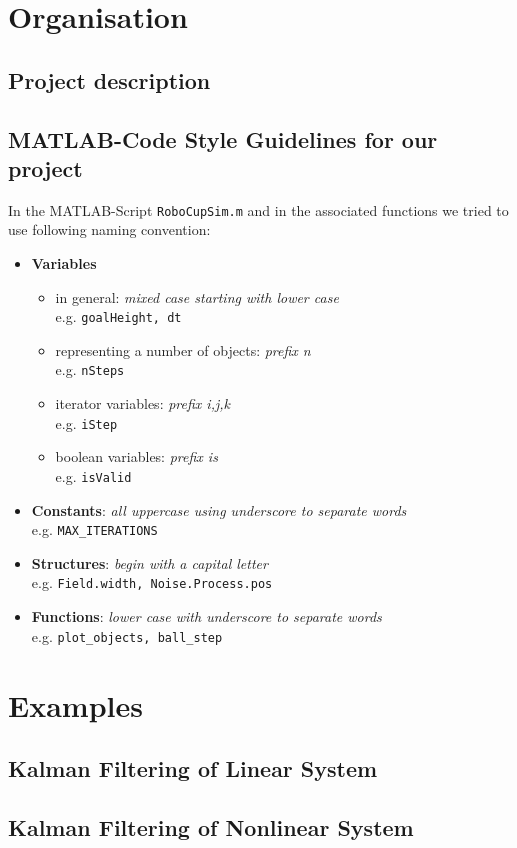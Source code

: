 
\appendix               	%
\chapter{Organisation} 
\section{Project description} \label{PrjDescription} 
%

\section{MATLAB-Code Style Guidelines for our project}
In the MATLAB-Script \texttt{RoboCupSim.m} and in the associated functions we tried to use following naming convention:
\begin{itemize}
	\item \textbf{Variables}
		\begin{itemize}
			\item in general: \emph{mixed case starting with lower case}\\
				e.g. \texttt{goalHeight, dt}
			\item representing a number of objects: \emph{prefix n}\\
				e.g. \texttt{nSteps}
			\item iterator variables: \emph{prefix i,j,k}\\
				e.g. \texttt{iStep}
			\item boolean variables: \emph{prefix is}\\
				e.g. \texttt{isValid}
		\end{itemize}
	
	\item \textbf{Constants}: \emph{all uppercase using underscore to separate words}\\
		e.g. \texttt{MAX\_ITERATIONS}
	
	\item \textbf{Structures}: \emph{begin with a capital letter}\\
		e.g. \texttt{Field.width, Noise.Process.pos}
	
	\item \textbf{Functions}: \emph{lower case with underscore to separate words}\\
		e.g. \texttt{plot\_objects, ball\_step}
\end{itemize}


\chapter{Examples} 
\section{Kalman Filtering of Linear System} \label{ExampleKF} 
%

\section{Kalman Filtering of Nonlinear System} \label{ExampleEKF}
%